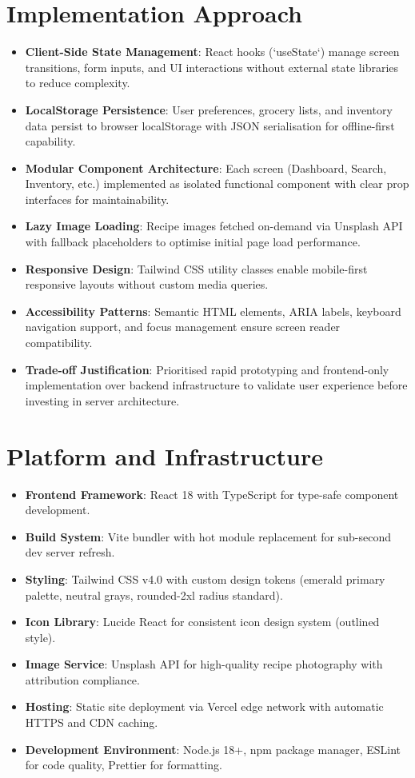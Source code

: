 \documentclass[12pt]{article}
\begin{document}
\section{Implementation Approach}
\begin{itemize}
  \item \textbf{Client-Side State Management}: React hooks (`useState`) manage screen transitions, form inputs, and UI interactions without external state libraries to reduce complexity.
  \item \textbf{LocalStorage Persistence}: User preferences, grocery lists, and inventory data persist to browser localStorage with JSON serialisation for offline-first capability.
  \item \textbf{Modular Component Architecture}: Each screen (Dashboard, Search, Inventory, etc.) implemented as isolated functional component with clear prop interfaces for maintainability.
  \item \textbf{Lazy Image Loading}: Recipe images fetched on-demand via Unsplash API with fallback placeholders to optimise initial page load performance.
  \item \textbf{Responsive Design}: Tailwind CSS utility classes enable mobile-first responsive layouts without custom media queries.
  \item \textbf{Accessibility Patterns}: Semantic HTML elements, ARIA labels, keyboard navigation support, and focus management ensure screen reader compatibility.
  \item \textbf{Trade-off Justification}: Prioritised rapid prototyping and frontend-only implementation over backend infrastructure to validate user experience before investing in server architecture.
\end{itemize}

\section{Platform and Infrastructure}
\begin{itemize}
  \item \textbf{Frontend Framework}: React 18 with TypeScript for type-safe component development.
  \item \textbf{Build System}: Vite bundler with hot module replacement for sub-second dev server refresh.
  \item \textbf{Styling}: Tailwind CSS v4.0 with custom design tokens (emerald primary palette, neutral grays, rounded-2xl radius standard).
  \item \textbf{Icon Library}: Lucide React for consistent icon design system (outlined style).
  \item \textbf{Image Service}: Unsplash API for high-quality recipe photography with attribution compliance.
  \item \textbf{Hosting}: Static site deployment via Vercel edge network with automatic HTTPS and CDN caching.
  \item \textbf{Development Environment}: Node.js 18+, npm package manager, ESLint for code quality, Prettier for formatting.
\end{itemize}
\end{document}
